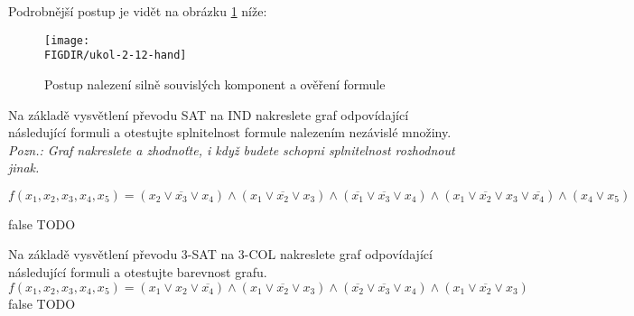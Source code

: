 \documentclass[10pt, a4paper]{ReportSheet}
\begin{document}
\begin{uloha}{12}{2}
        Podrobnější postup je vidět na obrázku \ref{fig:ukol-2-12-hand} níže:
        \begin{figure}[H]
            \centering
            \texttt{[image: \\FIGDIR/ukol-2-12-hand]}
            \caption{Postup nalezení silně souvislých komponent a ověření formule}
            \label{fig:ukol-2-12-hand}
        \end{figure}

    \end{uloha}

    \begin{uloha}{13}{2}{
        Na základě vysvětlení převodu SAT na IND nakreslete graf odpovídající následující formuli a otestujte splnitelnost formule nalezením nezávislé množiny.
        \textit{Pozn.: Graf nakreslete a zhodnoťte, i když budete schopni splnitelnost rozhodnout jinak.}

        \begin{equation*}
            f(x_1, x_2, x_3, x_4, x_5) = (x_2 \lor \overline{x_3} \lor x_4) \land (x_1 \lor \overline{x_2} \lor x_3) \land (\overline{x_1}
            \lor \overline{x_3}
            \lor
            x_4) \land (x_1 \lor \overline{x_2} \lor x_3 \lor \overline{x_4}) \land (x_4 \lor x_5)
        \end{equation*}
    }{false}
        TODO
    \end{uloha}

    \begin{uloha}{14}{2}{
        Na základě vysvětlení převodu 3-SAT na 3-COL nakreslete graf odpovídající následující formuli a otestujte barevnost grafu.
        \begin{equation*}
            f(x_1, x_2, x_3, x_4, x_5) = (x_1 \lor x_2 \lor \overline{x_4}) \land (x_1 \lor \overline{x_2} \lor x_3) \land (\overline{x_2}
            \lor \overline{x_3} \lor x_4) \land (x_1 \lor \overline{x_2} \lor x_3)
        \end{equation*}
    }{false}
        TODO
    \end{uloha}
\end{document}
